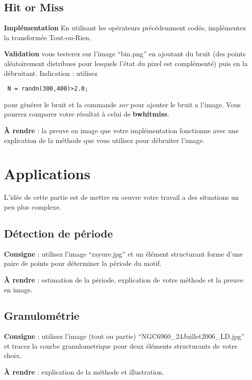 \documentclass[10pt,a4paper]{article}
\begin{document}
\subsection{Hit or Miss}
\textbf{Impl\'{e}mentation} En utilisant les op\'{e}rateurs pr\'{e}c\'{e}demment cod\'{e}s, impl\'{e}mentez la transform\'{e}e Tout-ou-Rien.

\noindent\textbf{Validation} vous testerez sur l'image ``bin.png'' en ajoutant du bruit (des points al\'{e}atoirement distribues pour lesquels l'\'{e}tat du pixel est compl\'{e}ment\'{e}) puis en la d\'{e}bruitant. Indication : utilisez \begin{verbatim} N = randn(300,400)>2.0;\end{verbatim} pour g\'{e}n\'{e}rer le bruit et la commande \textit{xor} pour ajouter le bruit a l'image. Vous pourrez comparer votre r\'{e}sultat \`{a} celui de \textbf{bwhitmiss}.

\noindent\textbf{\`{A} rendre} : la preuve en image que votre impl\'{e}mentation fonctionne avec une explication de la m\'{e}thode que vous utilisez pour d\'{e}bruiter l'image.

\clearpage
\section{Applications}
L'id\'{e}e de cette partie est de mettre en oeuvre votre travail a des situations un peu plus complexe.
\subsection{D\'{e}tection de p\'{e}riode}
\textbf{Consigne} : utilisez l'image ``rayure.jpg'' et un \'{e}l\'{e}ment structurant forme d'une paire de points pour d\'{e}terminer la p\'{e}riode du motif.

\noindent\textbf{\`{A} rendre} : estimation de la p\'{e}riode, explication de votre m\'{e}thode et la preuve en image.

\subsection{Granulom\'{e}trie}
\textbf{Consigne} : utilisez l'image (tout ou partie) ``NGC6960\_24Juillet2006\_LD.jpg'' et tracez la courbe granulometrique pour deux \'{e}l\'{e}ments structurants de votre choix.

\noindent\textbf{\`{A} rendre} : explication de la m\'{e}thode et illustration.
\end{document}
